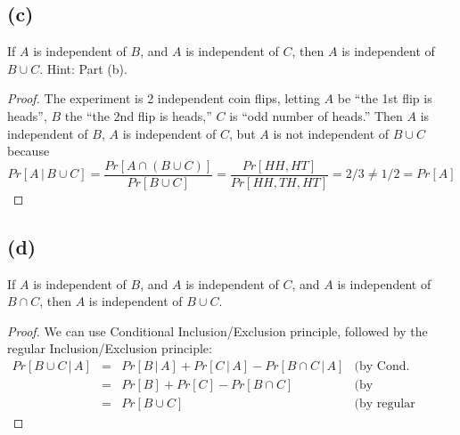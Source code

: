 \documentclass[14pt]{extarticle}
\begin{document}
\subsection{(c)}
If $A$ is independent of $B$, and $A$ is independent of $C$, then $A$ is independent of $B \cup C$. Hint: Part (b).

\begin{proof}
The experiment is 2 independent coin flips, letting $A$ be “the 1st flip is heads”, $B$ the “the 2nd flip is heads,” $C$ is “odd number of heads.” Then $A$ is independent of $B$, $A$ is independent of $C$, but $A$ is not independent of $B \cup C$ because
$$
Pr[A \,|\, B \cup C] = \frac{Pr[A \cap (B \cup C)]}{Pr[B \cup C]} = \frac{Pr[HH, HT]}{Pr[HH, TH, HT]} = 2/3 \neq 1/2 = Pr[A]
$$
\end{proof}

\subsection{(d)}
If $A$ is independent of $B$, and $A$ is independent of $C$, and $A$ is independent of $B \cap C$, then $A$ is independent of $B \cup C$.

\begin{proof}
We can use Conditional Inclusion/Exclusion principle, followed by the regular Inclusion/Exclusion principle:
$$
\begin{array}{rclr}
Pr[B \cup C \,|\, A]&=&Pr[B\,|\,A] + Pr[C\,|\,A] - Pr[B\cap C \,|\, A]&\text{(by Cond. Incl/Excl)}\\
&=&Pr[B] + Pr[C] - Pr[B \cap C]&\text{(by independence)}\\
&=&Pr[B \cup C]& \text{(by regular Incl/Excl)}
\end{array}
$$
\end{proof}
\end{document}
